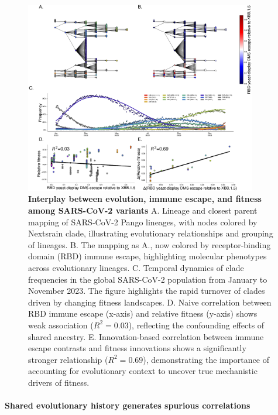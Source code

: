 \begin{figure}[h]
    \centering
    \includegraphics[width=0.9\textwidth]{./figures/interplay_phylo_escape_fitness.png}

    \caption[\textbf{Interplay between evolution, immune escape, and fitness among SARS-CoV-2 variants.}]{
	\textbf{Interplay between evolution, immune escape, and fitness among SARS-CoV-2 variants}
	A. Lineage and closest parent mapping of SARS-CoV-2 Pango lineages, with nodes colored by Nextsrain clade, illustrating evolutionary relationships and grouping of lineages.
	B. The mapping as A., now colored by receptor-binding domain (RBD) immune escape, highlighting molecular phenotypes across evolutionary lineages.
	C. Temporal dynamics of clade frequencies in the global SARS-CoV-2 population from January to November 2023. The figure highlights the rapid turnover of clades driven by changing fitness landscapes.
	D. Naive correlation between RBD immune escape (x-axis) and relative fitness (y-axis) shows weak association ($R^2 = 0.03$), reflecting the confounding effects of shared ancestry.
	E. Innovation-based correlation between immune escape contrasts and fitness innovations shows a significantly stronger relationship ($R^2 = 0.69$), demonstrating the importance of accounting for evolutionary context to uncover true mechanistic drivers of fitness.
    }
    \label{fig:interplay_phylo_escape_fitness}
\end{figure}

\paragraph{Shared evolutionary history generates spurious correlations}

